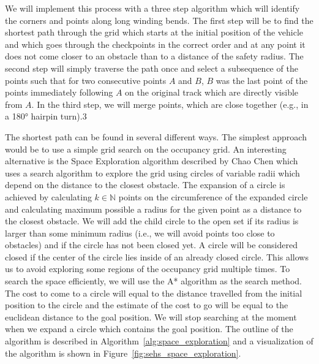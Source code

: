 
We will implement this process with a three step algorithm which will identify the corners and points along long winding bends. The first step will be to find the shortest path through the grid which starts at the initial position of the vehicle and which goes through the checkpoints in the correct order and at any point it does not come closer to an obstacle than to a distance of the safety radius. The second step will simply traverse the path once and select a subsequence of the points such that for two consecutive points $A$ and $B$, $B$ was the last point of the points immediately following $A$ on the original track which are directly visible from $A$. In the third step, we will merge points, which are close together (e.g., in a 180° hairpin turn).3

The shortest path can be found in several different ways. The simplest approach would be to use a simple grid search on the occupancy grid. An interesting alternative is the Space Exploration algorithm described by Chao Chen \cite{SEHS} which uses a search algorithm to explore the grid using circles of variable radii which depend on the distance to the closest obstacle. The expansion of a circle is achieved by calculating $k\in\mathbb{N}$ points on the circumference of the expanded circle and calculating maximum possible a radius for the given point as a distance to the closest obstacle. We will add the child circle to the open set if its radius is larger than some minimum radius (i.e., we will avoid points too close to obstacles) and if the circle has not been closed yet. A circle will be considered closed if the center of the circle lies inside of an already closed circle. This allows us to avoid exploring some regions of the occupancy grid multiple times. To search the space efficiently, we will use the A* algorithm as the search method. The cost to come to a circle will equal to the distance travelled from the initial position to the circle and the estimate of the cost to go will be equal to the euclidean distance to the goal position. We will stop searching at the moment when we expand a circle which contains the goal position. The outline of the algorithm is described in Algorithm~\ref{alg:space_exploration} and a visualization of the algorithm is shown in Figure~\ref{fig:sehs_space_exploration}.

